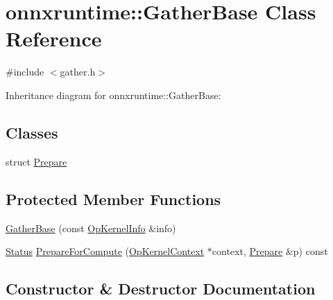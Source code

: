\hypertarget{classonnxruntime_1_1GatherBase}{}\section{onnxruntime\+:\+:Gather\+Base Class Reference}
\label{classonnxruntime_1_1GatherBase}


{\ttfamily \#include $<$gather.\+h$>$}



Inheritance diagram for onnxruntime\+:\+:Gather\+Base\+:
\subsection*{Classes}
\begin{DoxyCompactItemize}
\item 
struct \mbox{\hyperlink{structonnxruntime_1_1GatherBase_1_1Prepare}{Prepare}}
\end{DoxyCompactItemize}
\subsection*{Protected Member Functions}
\begin{DoxyCompactItemize}
\item 
\mbox{\hyperlink{classonnxruntime_1_1GatherBase_a4a615ffe58317c4421f01e7a28435aec}{Gather\+Base}} (const \mbox{\hyperlink{classonnxruntime_1_1OpKernelInfo}{Op\+Kernel\+Info}} \&info)
\item 
\mbox{\hyperlink{classonnxruntime_1_1common_1_1Status}{Status}} \mbox{\hyperlink{classonnxruntime_1_1GatherBase_a57e2ca61085240839c3303300f31efd3}{Prepare\+For\+Compute}} (\mbox{\hyperlink{classonnxruntime_1_1OpKernelContext}{Op\+Kernel\+Context}} $\ast$context, \mbox{\hyperlink{structonnxruntime_1_1GatherBase_1_1Prepare}{Prepare}} \&p) const
\end{DoxyCompactItemize}


\subsection{Constructor \& Destructor Documentation}
\mbox{\label{classonnxruntime_1_1GatherBase_a4a615ffe58317c4421f01e7a28435aec}} 
